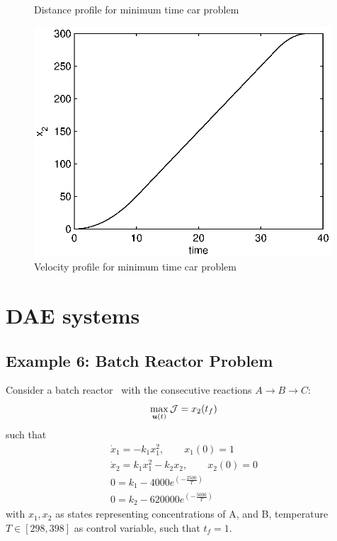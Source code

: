 \begin{figure}[htb]
\begin{minipage}[t]{0.32\linewidth}
\caption[Tutorial example constrained car: state profile 1]{Distance profile for
  minimum time car problem} \label{fig:car2_x1} 
\end{minipage}
\begin{minipage}[t]{0.32\linewidth}
\centering
\includegraphics[width=0.99\textwidth]{examples/problem-car2/car_x2.eps}
\caption[Tutorial example constrained car: state profile 2]{Velocity profile for
  minimum time car problem} \label{fig:car2_x2} 
\end{minipage}
\end{figure}

\section{DAE systems}
\label{sec:daes}

\subsection{Example 6: Batch Reactor Problem}
\label{sec:brpdae}

Consider a batch reactor~\citep{raj01,dad95} with the 
consecutive reactions $A \rightarrow B\rightarrow C$:
\begin{equation}
\max_{\ve{u}(t)} \mf{J} = x_{2}(t_{f}) \label{eq:batch_dae}
\end{equation}
such that
\begin{gather}
\dot{x}_{1} = -k_{1}x_{1}^{2}, \qquad x_1(0) = 1 \\
\dot{x}_{2} = k_{1}x_{1}^{2} - k_{2}x_{2}, \qquad x_2(0) = 0 \\
0 = k_{1} - 4000e^{(-\frac{2500}{T})} \\
0 = k_{2} - 620000e^{(-\frac{5000}{T})} 
\end{gather} with $x_{1}, x_{2}$ as states representing concentrations
of A, and B, temperature $T \in [298,398]$ as control variable, such
that $t_{f} = 1$.

